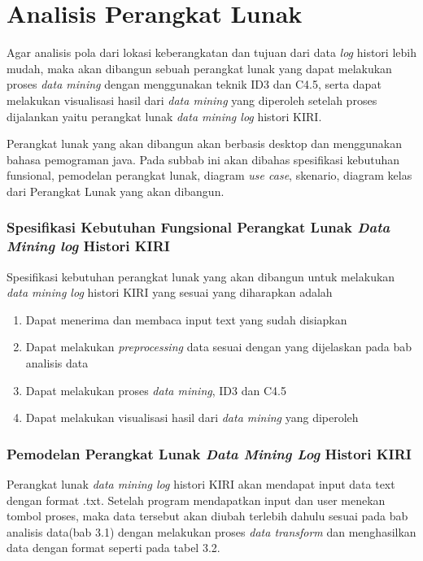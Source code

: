 \section{Analisis Perangkat Lunak}
Agar analisis pola dari lokasi keberangkatan dan tujuan dari data \textsl{log} histori lebih mudah, maka akan dibangun sebuah perangkat lunak yang dapat melakukan proses \textsl{data mining} dengan menggunakan teknik ID3 dan C4.5, serta dapat melakukan visualisasi hasil dari \textsl{data mining} yang diperoleh setelah proses dijalankan yaitu perangkat lunak \textsl{data mining log} histori KIRI. 

Perangkat lunak yang akan dibangun akan berbasis desktop dan menggunakan bahasa pemograman java. Pada subbab ini akan dibahas spesifikasi kebutuhan funsional, pemodelan perangkat lunak, diagram \textsl{use case}, skenario, diagram kelas dari Perangkat Lunak yang akan dibangun.

\subsubsection{Spesifikasi Kebutuhan Fungsional Perangkat Lunak \textsl{Data Mining log} Histori KIRI}
Spesifikasi kebutuhan perangkat lunak yang akan dibangun untuk melakukan \textsl{data mining log} histori KIRI yang sesuai yang diharapkan adalah
\begin{enumerate}
	\item Dapat menerima dan membaca input text yang sudah disiapkan
	\item Dapat melakukan \textsl{preprocessing} data sesuai dengan yang dijelaskan pada bab analisis data
	\item Dapat melakukan proses \textsl{data mining}, ID3 dan C4.5
	\item Dapat melakukan visualisasi hasil dari \textsl{data mining} yang diperoleh
\end{enumerate}

\subsubsection{Pemodelan Perangkat Lunak \textsl{Data Mining Log} Histori KIRI}
Perangkat lunak \textsl{data mining log} histori KIRI akan mendapat input data text dengan format .txt. Setelah program mendapatkan input dan user menekan tombol proses, maka data tersebut akan diubah terlebih dahulu sesuai pada bab analisis data(bab 3.1) dengan melakukan proses \textsl{data transform} dan menghasilkan data dengan format seperti pada tabel 3.2.

